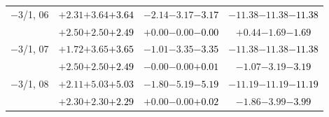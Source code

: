 \documentclass[compress]{beamer}
\begin{document}
\begin{frame}
\begin{tabular}{r | c | c | c}
$-$3/1, 06 & $+2.31$\hspace{0.1 cm}$+3.64$\hspace{0.1 cm}\textcolor{black}{$+3.64$} & $-2.14$\hspace{0.1 cm}$-3.17$\hspace{0.1 cm}\textcolor{black}{$-3.17$} & $-11.38$\hspace{0.1 cm}$-11.38$\hspace{0.1 cm}\textcolor{black}{$-11.38$} \\
           & $+2.50$\hspace{0.1 cm}$+2.50$\hspace{0.1 cm}\textcolor{black}{$+2.49$} & $+0.00$\hspace{0.1 cm}$-0.00$\hspace{0.1 cm}\textcolor{black}{$-0.00$} & $+0.44$\hspace{0.1 cm}$-1.69$\hspace{0.1 cm}\textcolor{black}{$-1.69$} \\
$-$3/1, 07 & $+1.72$\hspace{0.1 cm}$+3.65$\hspace{0.1 cm}\textcolor{black}{$+3.65$} & $-1.01$\hspace{0.1 cm}$-3.35$\hspace{0.1 cm}\textcolor{black}{$-3.35$} & $-11.38$\hspace{0.1 cm}$-11.38$\hspace{0.1 cm}\textcolor{black}{$-11.38$} \\
           & $+2.50$\hspace{0.1 cm}$+2.50$\hspace{0.1 cm}\textcolor{black}{$+2.49$} & $-0.00$\hspace{0.1 cm}$-0.00$\hspace{0.1 cm}\textcolor{black}{$+0.01$} & $-1.07$\hspace{0.1 cm}$-3.19$\hspace{0.1 cm}\textcolor{black}{$-3.19$} \\
$-$3/1, 08 & $+2.11$\hspace{0.1 cm}$+5.03$\hspace{0.1 cm}\textcolor{black}{$+5.03$} & $-1.80$\hspace{0.1 cm}$-5.19$\hspace{0.1 cm}\textcolor{black}{$-5.19$} & $-11.19$\hspace{0.1 cm}$-11.19$\hspace{0.1 cm}\textcolor{black}{$-11.19$} \\
           & $+2.30$\hspace{0.1 cm}$+2.30$\hspace{0.1 cm}\textcolor{black}{$+2.29$} & $+0.00$\hspace{0.1 cm}$-0.00$\hspace{0.1 cm}\textcolor{black}{$+0.02$} & $-1.86$\hspace{0.1 cm}$-3.99$\hspace{0.1 cm}\textcolor{black}{$-3.99$} \\

\end{tabular}
\end{frame}
\end{document}
